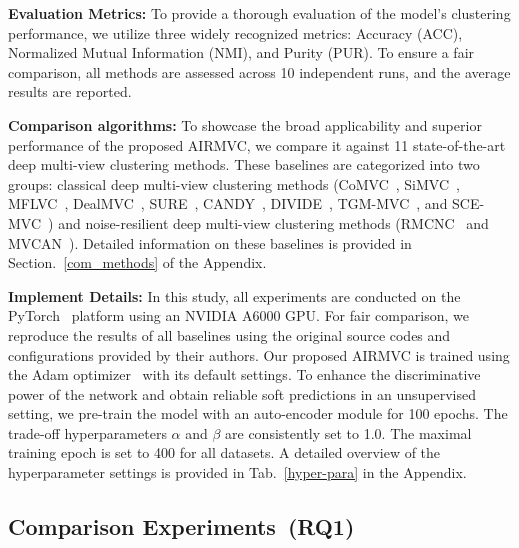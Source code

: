 \documentclass{article}
\theoremstyle{plain}
\theoremstyle{definition}
\theoremstyle{remark}
\begin{document}
\textbf{Evaluation Metrics:} To provide a thorough evaluation of the model's clustering performance, we utilize three widely recognized metrics: Accuracy (ACC), Normalized Mutual Information (NMI), and Purity (PUR). To ensure a fair comparison, all methods are assessed across 10 independent runs, and the average results are reported.


\textbf{{Comparison algorithms:}} To showcase the broad applicability and superior performance of the proposed AIRMVC, we compare it against 11 state-of-the-art deep multi-view clustering methods. These baselines are categorized into two groups: classical deep multi-view clustering methods (CoMVC~\cite{SiMVC}, SiMVC~\cite{SiMVC}, MFLVC~\cite{MFLVC}, DealMVC~\cite{DealMVC}, SURE~\cite{SURE}, CANDY~\cite{candy}, DIVIDE~\cite{DIVIDE}, TGM-MVC~\cite{TGM-MVC}, and SCE-MVC~\cite{SCE-MVC}) and noise-resilient deep multi-view clustering methods (RMCNC~\cite{sun2024robust} and MVCAN~\cite{MVCAN}). Detailed information on these baselines is provided in Section.~\ref{com_methods} of the Appendix.




\textbf{{Implement Details:}} In this study, all experiments are conducted on the PyTorch~\cite{pytorch} platform using an NVIDIA A6000 GPU. For fair comparison, we reproduce the results of all baselines using the original source codes and configurations provided by their authors. Our proposed AIRMVC is trained using the Adam optimizer~\cite{adam} with its default settings. To enhance the discriminative power of the network and obtain reliable soft predictions in an unsupervised setting, we pre-train the model with an auto-encoder module for 100 epochs. The trade-off hyperparameters $\alpha$ and $\beta$ are consistently set to 1.0. The maximal training epoch is set to 400 for all datasets. A detailed overview of the hyperparameter settings is provided in Tab.~\ref{hyper-para} in the Appendix.



\subsection{Comparison Experiments~\textbf{(RQ1)}}
\end{document}
